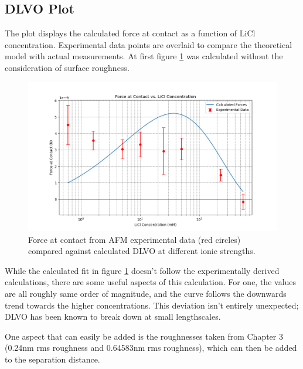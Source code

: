 \subsection*{DLVO Plot}

The plot displays the calculated force at contact as a function of LiCl concentration. Experimental data points are overlaid to compare the theoretical model with actual measurements. At first figure \ref{fig:calc1} was calculated without the consideration of surface roughness.

\begin{figure}[h!]
\centering
\includegraphics[width=\textwidth]{chapter8/Calculated/No_roughness.png}
\caption{Force at contact from AFM experimental data (red circles) compared against calculated DLVO at different ionic strengths.}
\label{fig:calc1}
\end{figure}

While the calculated fit in figure \ref{fig:calc1} doesn't follow the experimentally derived calculations, there are some useful aspects of this calculation. For one, the values are all roughly same order of magnitude, and the curve follows the downwards trend towards the higher concentrations. This deviation isn't entirely unexpected; DLVO has been known to break down at small lengthscales. \cite{Horinek2014}

One aspect that can easily be added is the roughnesses taken from Chapter 3 (0.24nm rms roughness and 0.64583nm rms roughness), which can then be added to the separation distance.

